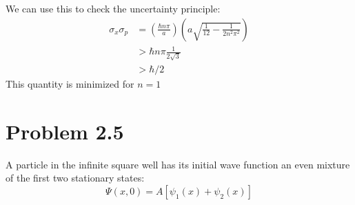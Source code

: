 \documentclass{article}
\newcommand{\paren}[1]{\left( #1 \right)}
\begin{document}
We can use this to check the uncertainty principle:
\begin{align*}
  \sigma_x \sigma_p &= \paren{\frac{\hbar n \pi}a} \paren{a \sqrt{\frac{1}{12} - \frac{1}{2n^2\pi^2}}} \\
                    &> \hbar n \pi \frac{1}{2\sqrt{3}} \\
                    &> \hbar / 2
\end{align*}
This quantity is minimized for $n = 1$

\section*{Problem 2.5}
A particle in the infinite square well has its initial wave function an even mixture of the first two stationary states:
$$\Psi(x, 0) = A[\psi_1(x) + \psi_2(x)]$$
\end{document}

